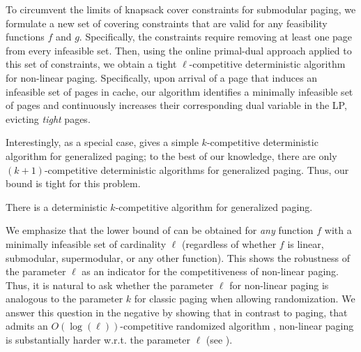 \documentclass[11pt]{article}
\begin{document}
To circumvent the limits of knapsack cover constraints for submodular paging, we formulate a new set of covering constraints that are valid for any feasibility functions $f$ and $g$. %
Specifically, the constraints require removing at least one page from every infeasible set. Then, using the online primal-dual approach applied to this set of constraints, we obtain a tight $\ell$-competitive deterministic algorithm for non-linear paging. Specifically, upon arrival of a page that induces an infeasible set of pages in cache, our algorithm identifies a minimally infeasible set of pages and continuously increases their corresponding dual variable in the LP, evicting {\em tight} pages.  %

Interestingly, as a special case,  gives a simple $k$-competitive deterministic algorithm for generalized paging; to the best of our knowledge, there are only $(k+1)$-competitive deterministic algorithms \cite{cao1997cost, young2002line} for generalized paging. Thus, our bound is tight for this problem.

\begin{cor}
	\label{thm:generalized}
	There is a deterministic $k$-competitive algorithm for \textnormal{generalized paging}. %
\end{cor}

We emphasize that the lower bound of  can be obtained for {\em any} function $f$ with a minimally infeasible set of cardinality $\ell$ (regardless of whether $f$ is linear, submodular, supermodular, or any other function). This shows the robustness of the parameter $\ell$ as an indicator for the competitiveness of non-linear paging. Thus, it is natural to ask whether the parameter $\ell$ for non-linear paging is analogous to the parameter $k$ for classic paging when allowing randomization. We answer this question in the negative by showing that in contrast to paging, that admits an $O(\log(\ell))$-competitive randomized algorithm \cite{fiat1991competitive}, non-linear paging is substantially harder w.r.t. the parameter $\ell$ (see ).
\end{document}
